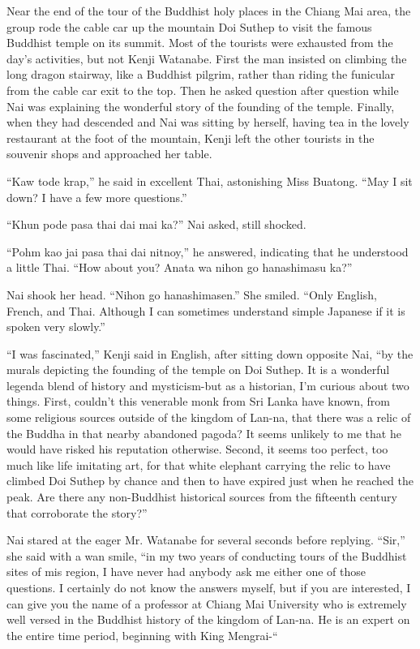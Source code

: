 \documentclass[]{article}
\begin{document}
{Near the end of the tour of the Buddhist holy places in the Chiang Mai area, the group rode the cable car up the mountain Doi Suthep to visit the famous Buddhist temple on its summit. Most of the tourists were exhausted from the day’s activities, but not Kenji Watanabe. First the man insisted on climbing the long dragon stairway, like a Buddhist pilgrim, rather than riding the funicular from the cable car exit to the top. Then he asked question after question while Nai was explaining the wonderful story of the founding of the temple. Finally, when they had descended and Nai was sitting by herself, having tea in the lovely restaurant at the foot of the mountain, Kenji left the other tourists in the souvenir shops and approached her table.

“Kaw tode krap,” he said in excellent Thai, astonishing Miss Buatong. “May I sit down? I have a few more questions.”

“Khun pode pasa thai dai mai ka?” Nai asked, still shocked.

“Pohm kao jai pasa thai dai nitnoy,” he answered, indicating that he understood a little Thai. “How about you? Anata wa nihon go hanashimasu ka?”

Nai shook her head. “Nihon go hanashimasen.” She smiled. “Only English, French, and Thai. Although I can sometimes understand simple Japanese if it is spoken very slowly.”

“I was fascinated,” Kenji said in English, after sitting down opposite Nai, “by the murals depicting the founding of the temple on Doi Suthep. It is a wonderful legenda blend of history and mysticism-but as a historian, I’m curious about two things. First, couldn’t this venerable monk from Sri Lanka have known, from some religious sources outside of the kingdom of Lan-na, that there was a relic of the Buddha in that nearby abandoned pagoda? It seems unlikely to me that he would have risked his reputation otherwise. Second, it seems too perfect, too much like life imitating art, for that white elephant carrying the relic to have climbed Doi Suthep by chance and then to have expired just when he reached the peak. Are there any non-Buddhist historical sources from the fifteenth century that corroborate the story?”

Nai stared at the eager Mr. Watanabe for several seconds before replying. “Sir,” she said with a wan smile, “in my two years of conducting tours of the Buddhist sites of mis region, I have never had anybody ask me either one of those questions. I certainly do not know the answers myself, but if you are interested, I can give you the name of a professor at Chiang Mai University who is extremely well versed in the Buddhist history of the kingdom of Lan-na. He is an expert on the entire time period, beginning with King Mengrai-“

}
\end{document}
